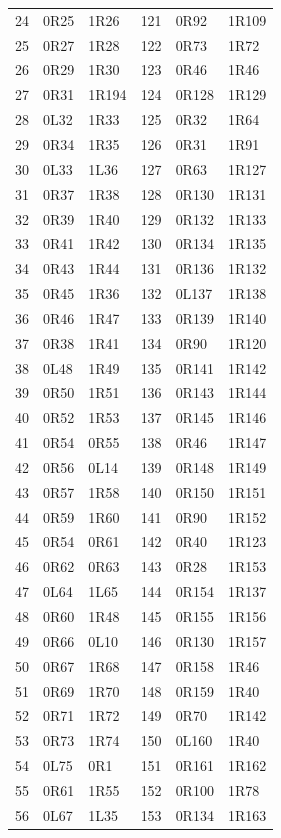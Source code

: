 \begin{longtable}{rll@{\qquad}rll}
24 & 0R25 & 1R26 & 121 & 0R92 & 1R109\\
25 & 0R27 & 1R28 & 122 & 0R73 & 1R72\\
26 & 0R29 & 1R30 & 123 & 0R46 & 1R46\\
27 & 0R31 & 1R194 & 124 & 0R128 & 1R129\\
28 & 0L32 & 1R33 & 125 & 0R32 & 1R64\\
29 & 0R34 & 1R35 & 126 & 0R31 & 1R91\\
30 & 0L33 & 1L36 & 127 & 0R63 & 1R127\\
31 & 0R37 & 1R38 & 128 & 0R130 & 1R131\\
32 & 0R39 & 1R40 & 129 & 0R132 & 1R133\\
33 & 0R41 & 1R42 & 130 & 0R134 & 1R135\\
34 & 0R43 & 1R44 & 131 & 0R136 & 1R132\\
35 & 0R45 & 1R36 & 132 & 0L137 & 1R138\\
36 & 0R46 & 1R47 & 133 & 0R139 & 1R140\\
37 & 0R38 & 1R41 & 134 & 0R90 & 1R120\\
38 & 0L48 & 1R49 & 135 & 0R141 & 1R142\\
39 & 0R50 & 1R51 & 136 & 0R143 & 1R144\\
40 & 0R52 & 1R53 & 137 & 0R145 & 1R146\\
41 & 0R54 & 0R55 & 138 & 0R46 & 1R147\\
42 & 0R56 & 0L14 & 139 & 0R148 & 1R149\\
43 & 0R57 & 1R58 & 140 & 0R150 & 1R151\\
44 & 0R59 & 1R60 & 141 & 0R90 & 1R152\\
45 & 0R54 & 0R61 & 142 & 0R40 & 1R123\\
46 & 0R62 & 0R63 & 143 & 0R28 & 1R153\\
47 & 0L64 & 1L65 & 144 & 0R154 & 1R137\\
48 & 0R60 & 1R48 & 145 & 0R155 & 1R156\\
49 & 0R66 & 0L10 & 146 & 0R130 & 1R157\\
50 & 0R67 & 1R68 & 147 & 0R158 & 1R46\\
51 & 0R69 & 1R70 & 148 & 0R159 & 1R40\\
52 & 0R71 & 1R72 & 149 & 0R70 & 1R142\\
53 & 0R73 & 1R74 & 150 & 0L160 & 1R40\\
54 & 0L75 & 0R1 & 151 & 0R161 & 1R162\\
55 & 0R61 & 1R55 & 152 & 0R100 & 1R78\\
56 & 0L67 & 1L35 & 153 & 0R134 & 1R163\\

\end{longtable}
